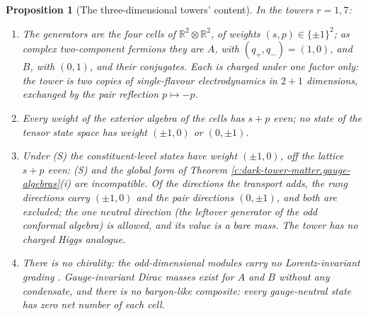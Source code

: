 \documentclass[11pt]{article}
\newtheorem{proposition}[theorem]{Proposition}
\theoremstyle{definition}
\theoremstyle{plain}
\newcommand{\changedmark}[2]{\marginpar{\raggedright\scriptsize\color{#1}#2}}
\providecommand{\R}{}\renewcommand{\R}{\mathbb{R}}
\begin{document}
\begin{proposition}[The three-dimensional towers' content]\label{c:dark-tower-matter.three-dimensional-content}
\changedmark{BurntOrange}{changed since the deposit}
In the towers $r = 1, 7$:
\begin{enumerate}
\item[(i)] The generators are the four cells of $\R^{2} \otimes \R^{2}$, of weights $(s, p) \in \{\pm 1\}^{2}$; as complex two-component fermions they are $A$, with $(q_{+}, q_{-}) = (1, 0)$, and $B$, with $(0, 1)$, and their conjugates. Each is charged under one factor only: the tower is two copies of single-flavour electrodynamics in $2+1$ dimensions, exchanged by the pair reflection $p \mapsto -p$.
\item[(ii)] Every weight of the exterior algebra of the cells has $s + p$ even; no state of the tensor state space has weight $(\pm 1, 0)$ or $(0, \pm 1)$.
\item[(iii)] Under (S) the constituent-level states have weight $(\pm 1, 0)$, off the lattice $s + p$ even: (S) and the global form of Theorem \ref{c:dark-tower-matter.gauge-algebras}(i) are incompatible. Of the directions the transport adds, the rung directions carry $(\pm 1, 0)$ and the pair directions $(0, \pm 1)$, and both are excluded; the one neutral direction (the leftover generator of the odd conformal algebra) is allowed, and its value is a bare mass. The tower has no charged Higgs analogue.
\item[(iv)] There is no chirality: the odd-dimensional modules carry no Lorentz-invariant grading \cite[Prop.~3.9]{ButlerT14}. Gauge-invariant Dirac masses exist for $A$ and $B$ without any condensate, and there is no baryon-like composite: every gauge-neutral state has zero net number of each cell.
\end{enumerate}
\end{proposition}
\end{document}
